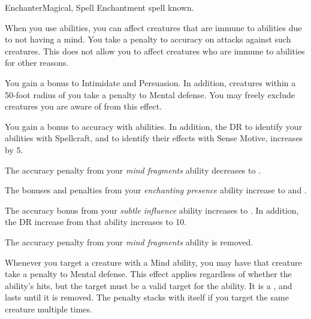     \begin{feat}{Enchanter}{Magical, Spell}
        \featpre Enchantment spell known.

         When you use  abilities, you can affect creatures that are immune to  abilities due to not having a mind.
        You take a  penalty to accuracy on attacks against such creatures.
        This does not allow you to affect creatures who are immune to  abilities for other reasons.

         You gain a  bonus to Intimidate and Persuasion.
        In addition, creatures within a 50-foot radius  of you take a  penalty to Mental defense.
        You may freely exclude creatures you are aware of from this effect.

         You gain a  bonus to accuracy with  abilities.
        In addition, the DR to identify your  abilities with Spellcraft, and to identify their effects with Sense Motive, increases by 5.

         The accuracy penalty from your \textit{mind fragments} ability decreases to .

         The bonuses and penalties from your \textit{enchanting presence} ability increase to  and .

         The accuracy bonus from your \textit{subtle influence} ability increases to .
        In addition, the DR increase from that ability increases to 10.

         The accuracy penalty from your \textit{mind fragments} ability is removed.

         Whenever you target a creature with a Mind ability, you may have that creature take a  penalty to Mental defense.
        This effect applies regardless of whether the ability's hits, but the target must be a valid target for the ability.
        It is a , and lasts until it is removed.
        The penalty stacks with itself if you target the same creature multiple times.
    \end{feat}

